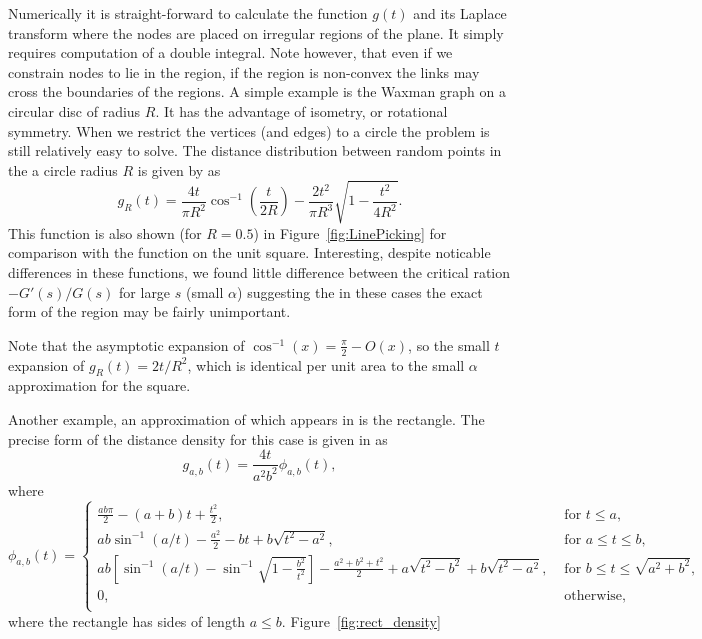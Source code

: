 \documentclass{article}
\begin{document}
Numerically it is straight-forward to calculate the function $g(t)$
and its Laplace transform where the nodes are placed on irregular
regions of the plane. It simply requires computation of a double
integral. Note however, that even if we constrain nodes to lie in the
region, if the region is non-convex the links may cross the boundaries
of the regions. A simple example is the Waxman graph on a circular disc
of radius $R$. It has the advantage of isometry, or rotational
symmetry.  When we restrict the vertices (and edges) to a circle the
problem is still relatively easy to solve. The distance distribution
between random points in the a circle radius $R$ is given by
\cite{tu00:_circle_line} as
\begin{equation}
   g_R(t)= \frac{4t}{\pi R^2} \cos^{-1}\left( \frac{t}{2R} \right)
          - \frac{2t^2}{\pi R^3} \sqrt{ 1- \frac{t^2}{4 R^2} }. 
  \label{eqn:circle}
\end{equation}
This function is also shown (for $R=0.5$) in
Figure~\ref{fig:LinePicking} for comparison with the function on the
unit square. Interesting, despite noticable differences in these
functions, we found little difference between the critical ration
$-G'(s)/G(s)$ for large $s$ (small $\alpha$) suggesting the in these
cases the exact form of the region may be fairly unimportant.

Note that the asymptotic expansion of $\cos^{-1}(x) = \frac{\pi}{2} -
O(x)$, so the small $t$ expansion of $g_R(t) = 2 t/R^2$, which is
identical per unit area to the small $\alpha$ approximation for the square.

Another example, an approximation of which appears in
\cite{m.naldi05:_connec_of_waxman_graph} is the rectangle. The precise
form of the distance density for this case is given in \cite[Theorem
2.4.4]{mathai_geom} as
\begin{equation}
  g_{a,b}(t) = \frac{4 t}{a^2 b^2} \phi_{a,b}(t),
  \label{eqn:rectangle}   
\end{equation}
where
\begin{equation}
  \phi_{a,b}(t) = \left\{
    \begin{array}{ll}
      \frac{ab \pi}{2} - (a+b) t + \frac{t^2}{2}, 
         & \mbox{ for } t \leq a, \\
      a b \sin^{-1} (a/t) - \frac{a^2}{2} - b t + b\sqrt{t^2 - a^2},
         & \mbox{ for } a \leq t \leq b, \\
      a b \left[ \sin^{-1} (a/t) - \sin^{-1} \sqrt{1 - \frac{b^2}{t^2}} \right]
        - \frac{a^2 + b^2 + t^2}{2} 
        + a\sqrt{t^2 - b^2}+ b\sqrt{t^2 - a^2},
         & \mbox{ for } b \leq t \leq \sqrt{a^2 + b^2}, \\
      0,
         & \mbox{ otherwise}, \\
    \end{array} \right. 
\end{equation}
where the rectangle has sides of length $a \leq b$. Figure~\ref{fig:rect_density}
\end{document}
